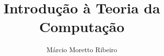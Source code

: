 \documentclass[a4,12pt]{book}
\begin{document}


\author{Márcio Moretto Ribeiro}

\title{Introdução à Teoria da Computação}

\maketitle
\tableofcontents







\appendix



%
\end{document}

